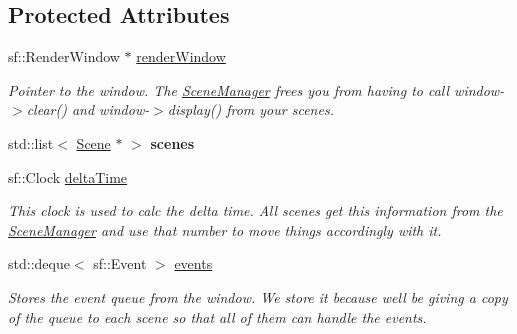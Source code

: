 \subsection*{Protected Attributes}
\begin{DoxyCompactItemize}
\item 
\mbox{\label{classzt_1_1_scene_manager_a1a0c6b40321c66709ae36f3ccd9f84f6}} 
sf\+::\+Render\+Window $\ast$ \hyperlink{classzt_1_1_scene_manager_a1a0c6b40321c66709ae36f3ccd9f84f6}{render\+Window}
\begin{DoxyCompactList}\small\item\em Pointer to the window. The \hyperlink{classzt_1_1_scene_manager}{Scene\+Manager} frees you from having to call window-\/$>$clear() and window-\/$>$display() from your scenes. \end{DoxyCompactList}\item 
\mbox{\label{classzt_1_1_scene_manager_ae79370ebeb570c32b61f2d99f443762f}} 
std\+::list$<$ \hyperlink{classzt_1_1_scene}{Scene} $\ast$ $>$ {\bfseries scenes}
\item 
\mbox{\label{classzt_1_1_scene_manager_a4b874be56a77810968973b7c6c5e850a}} 
sf\+::\+Clock \hyperlink{classzt_1_1_scene_manager_a4b874be56a77810968973b7c6c5e850a}{delta\+Time}
\begin{DoxyCompactList}\small\item\em This clock is used to calc the delta time. All scenes get this information from the \hyperlink{classzt_1_1_scene_manager}{Scene\+Manager} and use that number to move things accordingly with it. \end{DoxyCompactList}\item 
\mbox{\label{classzt_1_1_scene_manager_ab98ec372db998caa20e060a6e49fed72}} 
std\+::deque$<$ sf\+::\+Event $>$ \hyperlink{classzt_1_1_scene_manager_ab98ec372db998caa20e060a6e49fed72}{events}
\begin{DoxyCompactList}\small\item\em Stores the event queue from the window. We store it because we\textquotesingle{}ll be giving a copy of the queue to each scene so that all of them can handle the events. \end{DoxyCompactList}\end{DoxyCompactItemize}


